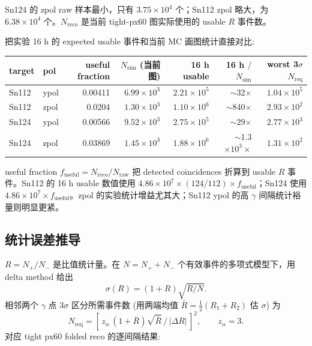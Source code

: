 \documentclass[a4paper,11pt]{article}
\begin{document}
Sn124 的 zpol raw 样本最小，只有 $3.75\times10^4$ 个；Sn112 zpol 略大，为 $6.38\times10^4$ 个。$N_{\mathrm{reco}}$ 是当前 tight-px60 图实际使用的 usable $R$ 事件数。

把实验 16 h 的 expected usable 事件和当前 MC 画图统计直接对比:

\begin{table}[H]
\centering
\begin{tabular}{llrrrrr}
\toprule
target & pol & useful fraction & $N_{\mathrm{sim}}$ (当前图) & 16 h usable & 16 h $/$ $N_{\mathrm{sim}}$ & worst 3$\sigma$ $N_{\mathrm{req}}$ \\
\midrule
Sn112 & ypol & 0.00411 & $6.99\times10^3$ & $2.21\times10^5$ & $\sim$32$\times$ & $1.04\times10^5$ \\
Sn112 & zpol & 0.0204 & $1.30\times10^3$ & $1.10\times10^6$ & $\sim$840$\times$ & $2.93\times10^2$ \\
Sn124 & ypol & 0.00566 & $9.52\times10^3$ & $2.75\times10^5$ & $\sim$29$\times$ & $2.77\times10^3$ \\
Sn124 & zpol & 0.03869 & $1.45\times10^3$ & $1.88\times10^6$ & $\sim$1.3$\times10^3\times$ & $1.31\times10^2$ \\
\bottomrule
\end{tabular}
\end{table}

useful fraction $f_{\mathrm{useful}}=N_{\mathrm{reco}}/N_{\mathrm{raw}}$ 把 detected coincidences 折算到 usable $R$ 事件。Sn112 的 16 h usable 数值使用 $4.86\times10^7\times(124/112)\times f_{\mathrm{useful}}$；Sn124 使用 $4.86\times10^7\times f_{\mathrm{useful}}$。zpol 的实验统计增益尤其大；Sn112 ypol 的高 $\gamma$ 间隔统计裕量则明显更紧。

\subsection{统计误差推导}

$R=N_{+}/N_{-}$ 是比值统计量。在 $N=N_{+}+N_{-}$ 个有效事件的多项式模型下，用 delta method 给出
\[
  \sigma(R) = (1+R)\sqrt{R/N}.
\]
相邻两个 $\gamma$ 点 3$\sigma$ 区分所需事件数 (用两端均值 $\bar R=\tfrac12(R_1+R_2)$ 估 $\sigma$) 为
\[
  N_{\mathrm{req}} = \left[\, z_\alpha\,(1+\bar R)\sqrt{\bar R}\,/\,|\Delta R|\,\right]^2, \qquad z_\alpha=3.
\]
对应 tight px60 folded reco 的逐间隔结果:
\end{document}
